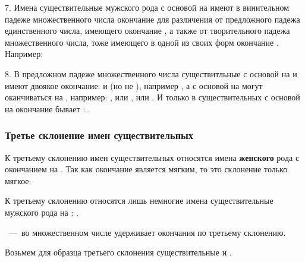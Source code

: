 \documentclass[11pt,a4paper,oneside]{memoir}
\begin{document}
    7. Имена существительные мужского рода с основой на {} имеют в винительном падеже множественного числа окончание {} для различения от предложного падежа единственного числа, имеющего окончание {}, а также от творительного падежа множественного числа, тоже имеющего в одной из своих форм окончание {}. Например:
    
    \medskip{}

    8. В предложном падеже множественного числа существитльные с основой на {} и {} имеют двоякое окончание: {} и {} (но не {}), например {}, а с основой на {} могут оканчиваться на {}, например: {}, или {}, или {}. И только в существительных с основой на {} окончание бывает {}: {}.

                \subsubsection{Третье склонение имен существительных}

    К третьему склонению имен существительных относятся имена \textbf{женского} рода с окончанием на {}. Так как окончание {} является мягким, то это склонение только мягкое.
    
    К третьему склонению относятся лишь немногие имена существительные мужского рода на {}: {}.
    
    {}~---~во множественном числе удерживает окончания по третьему склонению.
    
    Возьмем для образца третьего склонения существительные {} и {}.
    
\end{document}
